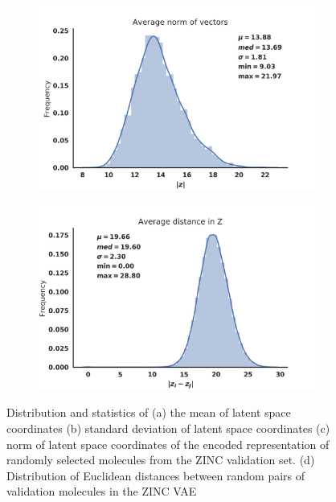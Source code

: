 \begin{figure}[h]
\begin{subfigure}{0.45\textwidth}
    \includegraphics[width=\textwidth]{./norm_Z.png}
  \end{subfigure}
  \begin{subfigure}{0.45\textwidth}
    \caption{}
    \includegraphics[width=\textwidth]{./distance_Z.png}
  \end{subfigure}
\caption[Latent Space Distribution Statistics]{Distribution and statistics of (a) the mean of latent space coordinates (b) standard deviation of latent space coordinates (c) norm of latent space coordinates of the encoded representation of randomly selected molecules from the ZINC validation set. (d) Distribution of Euclidean distances between random pairs of validation molecules in the ZINC VAE }
\label{fig:ls_stats}
\end{figure}


